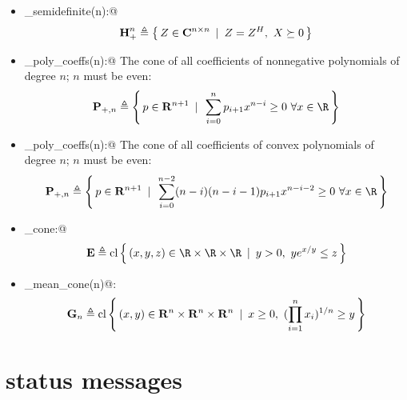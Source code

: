 \documentclass[12pt]{article}
\newcommand{\herm}{{\mbox{\bf H}}}  %
\begin{document}
\begin{itemize}
\item \verb@hermitian_semidefinite(n):@ 
\begin{equation*}
\herm^n_+ \eqbydef \Condset{Z\in\complex^{n\times n}}{Z=Z^H,~X\succeq 0}
\end{equation*}
\item \verb@nonneg_poly_coeffs(n):@ The cone of all coefficients of nonnegative
polynomials of degree $n$; $n$ must be even:
\begin{equation*}
\mathbf{P}_{+,n} \eqbydef \Condset{p\in\Rn[n+1]}{\sum_{i=0}^n p_{i+1} x^{n-i} \geq 0 ~ \forall x\in\R }
\end{equation*}
\item \verb@convex_poly_coeffs(n):@ The cone of all coefficients of convex
polynomials of degree $n$; $n$ must be even:
\begin{equation*}
\mathbf{P}_{+,n} \eqbydef \Condset{p\in\Rn[n+1]}{\sum_{i=0}^{n-2} (n-i)(n-i-1) p_{i+1} x^{n-i-2} \geq 0 ~ \forall x\in\R }
\end{equation*}
\item \verb@exponential_cone:@
\begin{equation*}
\mathbf{E} \eqbydef \text{cl}\Condset{(x,y,z)\in\R\times\R\times\R}{y>0,~ye^{x/y}\leq z}
\end{equation*}
\item \verb@geo_mean_cone(n)@:
\begin{equation*}
\mathbf{G}_n \triangleq \text{cl}\left\{\,(x,y)\in\mathbf{R}^{n}\times\mathbf{R}^{n}\times\mathbf{R}^{n}\,~|~\,x\geq 0,~(\prod_{i=1}^n x_i)^{1/n} \geq y\,\right\}
\end{equation*}
\end{itemize}

\newpage
\section{\cvx status messages}
\label{sec:status}
\end{document}

